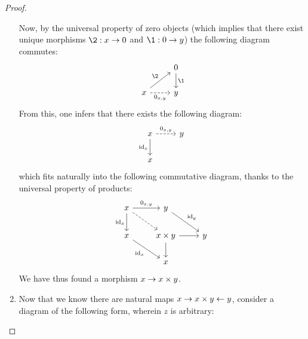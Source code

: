 \begin{proof}
\begin{enumerate}
                                Now, by the universal property of zero objects (which implies that there exist unique morphisms $\2: x \to 0$ and $\1: 0 \to y$) the following diagram commutes:
                                    $$
                                        \begin{tikzcd}
                                                                                               & 0 \arrow[d, "\1"] \\
                                            x \arrow[r, "{0_{x, y}}"', dashed] \arrow[ru, "\2"] & y                
                                        \end{tikzcd}
                                    $$
                                From this, one infers that there exists the following diagram:
                                    $$
                                        \begin{tikzcd}
                                            x \arrow[r, "{0_{x, y}}", dashed] \arrow[d, "\id_x"'] & y \\
                                            x                                                     &  
                                        \end{tikzcd}
                                    $$
                                which fits naturally into the following commutative diagram, thanks to the universal property of products:
                                    $$
                                        \begin{tikzcd}
                                        	x & y \\
                                        	x & {x \x y} & y \\
                                        	& x
                                        	\arrow["{0_{x, y}}", from=1-1, to=1-2]
                                        	\arrow["{\id_x}"', from=1-1, to=2-1]
                                        	\arrow[from=2-2, to=3-2]
                                        	\arrow[from=2-2, to=2-3]
                                        	\arrow["{\id_x}"', from=2-1, to=3-2]
                                        	\arrow["{\id_y}", from=1-2, to=2-3]
                                        	\arrow[dashed, from=1-1, to=2-2]
                                        \end{tikzcd}
                                    $$
                                We have thus found a morphism  $x \to x \x y$.
                                \item Now that we know there are natural maps $x \to x \x y \ot y$, consider a diagram of the following form, wherein $z$ is arbitrary:

\end{enumerate}
\end{proof}
